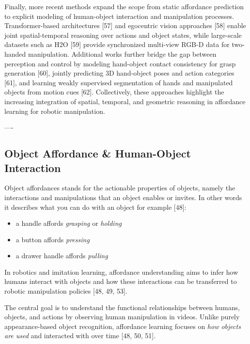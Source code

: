 Finally, more recent methods expand the scope from static affordance prediction to explicit modeling of human-object interaction and manipulation processes. Transformer-based architectures [57] and egocentric vision approaches [58] enable joint spatial-temporal reasoning over actions and object states, while large-scale datasets such as H2O [59] provide synchronized multi-view RGB-D data for two-handed manipulation. Additional works further bridge the gap between perception and control by modeling hand-object contact consistency for grasp generation [60], jointly predicting 3D hand-object poses and action categories [61], and learning weakly supervised segmentation of hands and manipulated objects from motion cues [62]. Collectively, these approaches highlight the increasing integration of spatial, temporal, and geometric reasoning in affordance learning for robotic manipulation.













----

\subsection{Object Affordance \& Human-Object Interaction}
Object affordances stands for the actionable properties of objects, namely the interactions and manipulations that an object enables or invites. In other words it describes what you can do with an object for example [48]:
\begin{itemize}
    \item a handle affords \textit{grasping} or \textit{holding}
    \item a button affords \textit{pressing}
    \item a drawer handle affords \textit{pulling}
\end{itemize}
In robotics and imitation learning, affordance understanding aims to infer how humans interact with objects and how these interactions can be transferred to robotic manipulation policies [48, 49, 53].

The central goal is to understand the functional relationships between humans, objects, and actions by observing human manipulation in videos. Unlike purely appearance-based object recognition, affordance learning focuses on \textit{how objects are used} and interacted with over time [48, 50, 51].


